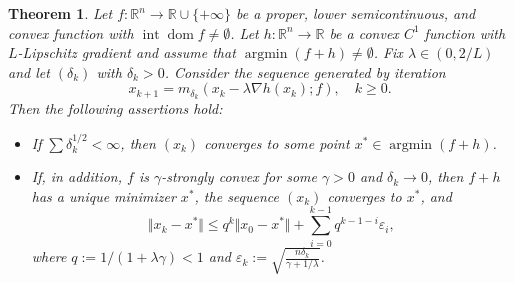 \documentclass[11pt]{article}
\newcommand{\1}{\mathds{1}}
\newtheorem{theorem}{Theorem}[section]
\theoremstyle{definition}
\theoremstyle{remark}
\theoremstyle{definition}
\newcommand{\R}{\mathbb{R}}
\newcommand{\dom}{\operatorname{dom}}
\begin{document}
\begin{theorem}\label{TeoConverAlg}
Let $f\colon \R^n\to\R\cup\{+\infty\}$ be a proper, lower semicontinuous, and convex function with
$\operatorname{int}\dom f\neq\emptyset$. Let $h\colon \mathbb{R}^n \to \mathbb{R}$ be a convex $C^1$ function with $L$-Lipschitz gradient  and assume that $\operatorname{argmin} (f+h)\neq\emptyset$.
Fix $\lambda\in (0,2/L)$ and let $(\delta_k)$ with $\delta_k>0$. Consider the sequence generated by iteration
$$
x_{k+1}=m_{\delta_k}(x_k-\lambda \nabla h(x_k);f), \quad k\geq 0.
$$
Then the following assertions hold:
\begin{itemize}
    \item[(i)]  If $\sum \delta_k^{1/2}<\infty$, then $(x_k)$ converges to some point $x^{\ast}\in \operatorname{argmin}(f+h)$.
\item[(ii)] If, in addition, $f$ is $\gamma$-strongly convex for some $\gamma>0$ and $\delta_k\to 0$,  then \(f+h\) has a unique minimizer \(x^\ast\), the sequence \((x_k)\) converges to \(x^\ast\), and
$$
\Vert x_{k}-x^{\ast}\Vert \leq q^k\Vert x_0-x^{\ast}\Vert +\sum_{i=0}^{k-1}q^{k-1-i}\varepsilon_i,
$$
where $q:=1/(1+\lambda \gamma)<1$ and $\varepsilon_k:=\sqrt{\frac{n\delta_k}{\gamma+1/\lambda}}$.
\end{itemize}
\end{theorem}
\end{document}

